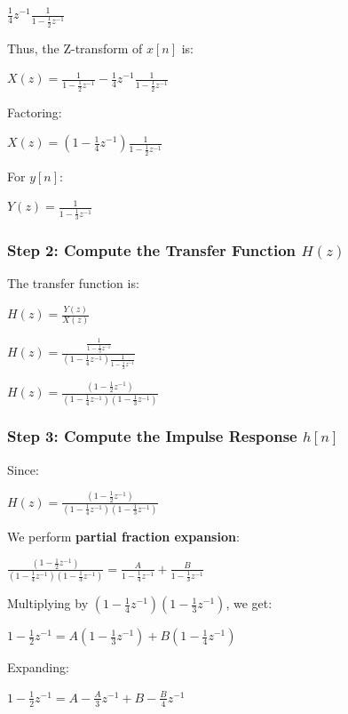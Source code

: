 \documentclass[11pt]{article}
\begin{document}
\(\frac{1}{4} z^{-1} \frac{1}{1 - \frac{1}{2} z^{-1}}\)

Thus, the Z-transform of \(x[n]\) is:

\(X(z) = \frac{1}{1 - \frac{1}{2} z^{-1}} - \frac{1}{4} z^{-1} \frac{1}{1 - \frac{1}{2} z^{-1}}\)

Factoring:

\(X(z) = \left( 1 - \frac{1}{4} z^{-1} \right) \frac{1}{1 - \frac{1}{2} z^{-1}}\)

For \(y[n]\):

\(Y(z) = \frac{1}{1 - \frac{1}{3} z^{-1}}\)

\subsubsection{\texorpdfstring{\textbf{Step 2: Compute the Transfer
Function
\(H(z)\)}}{Step 2: Compute the Transfer Function H(z)}}\label{step-2-compute-the-transfer-function-hz}

The transfer function is:

\(H(z) = \frac{Y(z)}{X(z)}\)

\(H(z) = \frac{\frac{1}{1 - \frac{1}{3} z^{-1}}}{\left(1 - \frac{1}{4} z^{-1} \right) \frac{1}{1 - \frac{1}{2} z^{-1}}}\)

\(H(z) = \frac{(1 - \frac{1}{2} z^{-1})}{(1 - \frac{1}{4} z^{-1})(1 - \frac{1}{3} z^{-1})}\)

\subsubsection{\texorpdfstring{\textbf{Step 3: Compute the Impulse
Response
\(h[n]\)}}{Step 3: Compute the Impulse Response h{[}n{]}}}\label{step-3-compute-the-impulse-response-hn}

Since:

\(H(z) = \frac{(1 - \frac{1}{2} z^{-1})}{(1 - \frac{1}{4} z^{-1})(1 - \frac{1}{3} z^{-1})}\)

We perform \textbf{partial fraction expansion}:

\(\frac{(1 - \frac{1}{2} z^{-1})}{(1 - \frac{1}{4} z^{-1})(1 - \frac{1}{3} z^{-1})} = \frac{A}{1 - \frac{1}{4} z^{-1}} + \frac{B}{1 - \frac{1}{3} z^{-1}}\)

Multiplying by \((1 - \frac{1}{4} z^{-1})(1 - \frac{1}{3} z^{-1})\), we
get:

\(1 - \frac{1}{2} z^{-1} = A(1 - \frac{1}{3} z^{-1}) + B(1 - \frac{1}{4} z^{-1})\)

Expanding:

\(1 - \frac{1}{2} z^{-1} = A - \frac{A}{3} z^{-1} + B - \frac{B}{4} z^{-1}\)
\end{document}
